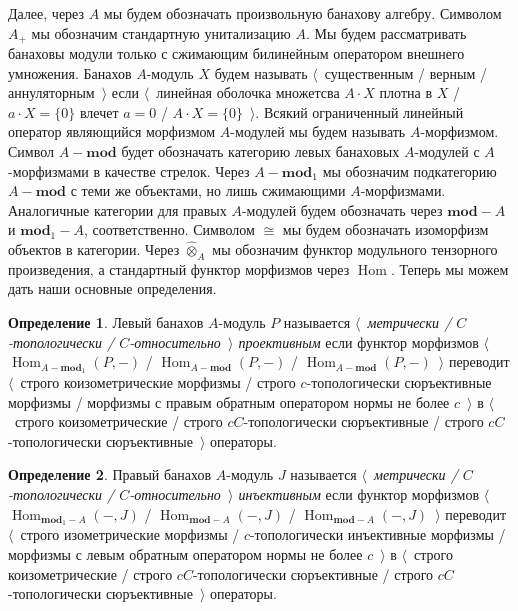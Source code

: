 \documentclass{article}
\numberwithin{equation}{section}
\theoremstyle{plain}
\theoremstyle{definition}
\newtheorem{definition}{Определение}
\newcommand{\projtens}{\mathbin{\widehat{\otimes}}}
\newcommand{\isom}{\mathop{\mathbin{\cong}}}
\begin{document}
\begin{fulltext}
Далее, через $A$ мы будем обозначать произвольную банахову алгебру. Символом $A_+$ мы 
обозначим стандартную унитализацию $A$. Мы будем рассматривать банаховы модули только 
с сжимающим билинейным оператором внешнего умножения. Банахов $A$-модуль $X$ будем 
называть $\langle$~существенным / верным / аннуляторным~$\rangle$ если 
$\langle$~линейная оболочка множетсва $A\cdot X$ плотна в $X$ / $a\cdot X=\{0\}$ 
влечет $a=0$ / $A\cdot X=\{0\}$~$\rangle$. Всякий 
ограниченный линейный оператор являющийся морфизмом $A$-модулей мы будем называть 
$A$-морфизмом. Символ $A-\mathbf{mod}$ будет обозначать категорию левых банаховых 
$A$-модулей с $A$-морфизмами в качестве стрелок. Через $A-\mathbf{mod}_1$ мы обозначим 
подкатегорию $A-\mathbf{mod}$ с теми же объектами, но лишь сжимающими $A$-морфизмами. 
Аналогичные категории для правых $A$-модулей будем обозначать через $\mathbf{mod}-A$ 
и $\mathbf{mod}_1-A$, соответственно. Символом $\isom$ мы будем обозначать изоморфизм 
объектов в категории. Через $\projtens_A$ мы обозначим функтор модульного тензорного 
произведения, а стандартный функтор морфизмов через $\operatorname{Hom}$. Теперь мы 
можем дать наши основные определения.

\begin{definition} Левый банахов $A$-модуль $P$ называется
\emph{$\langle$~метрически / $C$-топологически / $C$-относительно~$\rangle$ проективным} 
если функтор морфизмов $\langle$~$\operatorname{Hom}_{A-\mathbf{mod}_1}(P,-)$ / $\operatorname{Hom}_{A-\mathbf{mod}}(P,-)$ / 
$\operatorname{Hom}_{A-\mathbf{mod}}(P,-)$~$\rangle$ переводит 
$\langle$~строго коизометрические морфизмы / строго $c$-топологически сюръективные 
морфизмы / морфизмы с правым обратным оператором нормы не более $c$~$\rangle$ в 
$\langle$~строго коизометрические / строго $c C$-топологически сюръективные / 
строго $c C$-топологически сюръективные~$\rangle$ операторы.
\end{definition}

\begin{definition} Правый банахов $A$-модуль $J$ называется \emph{$\langle$~метрически / 
$C$-топологически / $C$-относительно~$\rangle$ инъективным} если функтор морфизмов $\langle$~$\operatorname{Hom}_{\mathbf{mod}_1-A}(-,J)$ / 
$\operatorname{Hom}_{\mathbf{mod}-A}(-,J)$ / 
$\operatorname{Hom}_{\mathbf{mod}-A}(-,J)$~$\rangle$ переводит $\langle$~строго 
изометрические морфизмы / $c$-топологически инъективные морфизмы / морфизмы с 
левым обратным оператором нормы не более $c$~$\rangle$ в 
$\langle$~строго коизометрические / строго $c C$-топологически сюръективные / 
строго $c C$-топологически сюръективные~$\rangle$ операторы.
\end{definition}


\end{fulltext}
\end{document}
